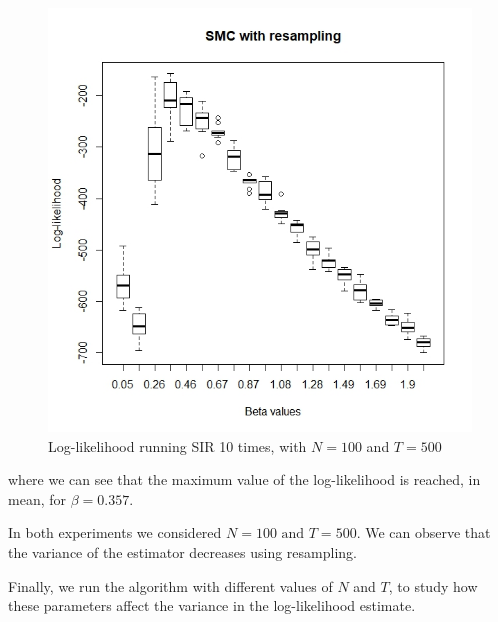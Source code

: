 \documentclass[]{article}
\begin{document}
\begin{figure}
	\includegraphics[width=\columnwidth]{task1/SIR_N_100_T_500.jpeg}
	\caption{Log-likelihood running SIR 10 times, with $N=100$ and $T=500$}
\end{figure}
where we can see that the maximum value of the log-likelihood is reached, in mean, for $\beta=0.357$.

In both experiments we considered $N=100 \text{ and } T=500$. We can observe that the variance of the estimator decreases using resampling. 

Finally, we run the algorithm with different values of $N$ and $T$, to study how these parameters affect the variance in the log-likelihood estimate. 
\end{document}

